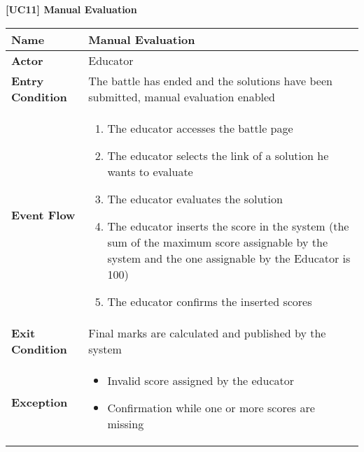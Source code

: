 \documentclass{article}
\begin{document}
\begin{table}
 \renewcommand{\arraystretch}{1.5}
    \centering
    \raggedright\textbf{[UC11] Manual Evaluation}
    \begin{tabular}{|l|p{10cm}|}
        \hline
        \textbf{Name} & Manual Evaluation \\
        \hline
        \textbf{Actor} & Educator \\
        \hline
        \textbf{Entry Condition} & The battle has ended and the solutions have been submitted, manual evaluation enabled\\
        \hline
        \textbf{Event Flow} & 
        \begin{enumerate}[align=left, topsep=0pt, partopsep=0pt]
            \item The educator accesses the battle page
            \item The educator selects the link of a solution he wants to evaluate
            \item The educator evaluates the solution 
            \item The educator inserts the score in the system (the sum of the maximum score assignable by the system and the one assignable by the Educator is 100)
            \item The educator confirms the inserted scores
        \end{enumerate} \\
        \hline
        \textbf{Exit Condition} & Final marks are calculated and published by the system  \\
        \hline
        \textbf{Exception} & 
        \begin{itemize}[topsep=0pt, partopsep=0pt]
            \item Invalid score assigned by the educator
            \item Confirmation while one or more scores are missing
        \end{itemize} \\
        \hline
    \end{tabular}
\end{table}
\end{document}

